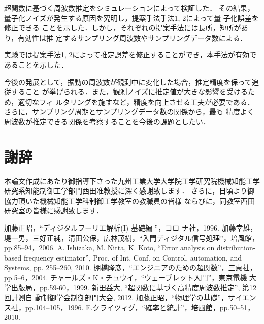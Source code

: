 \documentclass[a4paper,12pt]{jarticle}
\begin{document}
超関数に基づく周波数推定をシミュレーションによって検証した．
その結果，量子化ノイズが発生する原因を究明し，提案手法手法1, 2によって量
子化誤差を修正できる
ことを示した．しかし，それぞれの提案手法には長所，短所があり，有効性は推
定するサンプリング周波数やサンプリングデータ数による．

実験では提案手法1, 2によって推定誤差を修正することができ，本手法が有効で
あることを示した．

今後の発展として，振動の周波数が観測中に変化した場合，推定精度を保って追従すること
が挙げられる．また，観測ノイズに推定値が大きな影響を受けるため，適切なフィ
ルタリングを施すなど，精度を向上させる工夫が必要である．
さらに，サンプリング周期とサンプリングデータ数の関係から，最も
精度よく周波数が推定できる関係を考察することを今後の課題としたい．

\section*{謝辞}
本論文作成にあたり御指導下さった九州工業大学大学院工学研究院機械知能工学
研究系知能制御工学部門西田准教授に深く感謝致します．
さらに，日頃より御協力頂いた機械知能工学科制御工学教室の教職員の皆様
ならびに，同教室西田研究室の皆様に感謝致します．
\newpage
\begin{thebibliography}{99}
 加藤正昭，``ディジタルフーリエ解析(I)-基礎編-''，コロ
				ナ社，1996.
 加藤幸雄，堤一男，三好正純，清田公保，広林茂樹，``入門ディジタル信号処理''，培風館，pp.85--94，2006.
 A. Ishizaka, M. Nitta, K. Koto, ``Error analysis on
	 distribution-based frequency estimator'', Proc. of
	 Int. Conf. on Control, automation, and Systems, pp. 255--260, 2010.
 棚橋隆彦，``エンジニアのための超関数''，三恵社，pp.5--6，2004.
 チャールズ・K・チュウイ，``ウェーブレット入門''，東京電機
				大学出版局，pp.59-60，1999.
  新田益大, ``超関数に基づく高精度周波数推定'', 第12回計測自
	 動制御学会制御部門大会, 2012.
 加藤正昭，``物理学の基礎''，サイエンス社，pp.104--105，1996.
 E.クライツィグ，``確率と統計''，培風館，pp.50--51，2010.
\end{thebibliography}
\end{document}
